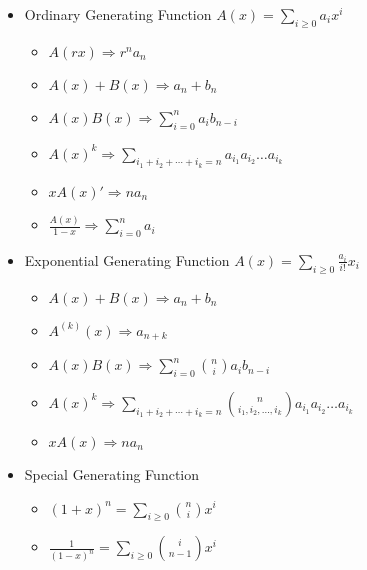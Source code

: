 \begin{itemize}
\item Ordinary Generating Function
$A(x) = \sum_{i\ge 0} a_ix^i$
\begin{itemize}
    \itemsep-0.5em
    \item $A(rx)             \Rightarrow r^na_n$
    \item $A(x) + B(x)       \Rightarrow a_n + b_n$
    \item $A(x)B(x)          \Rightarrow \sum_{i=0}^{n} a_ib_{n-i}$
    \item $A(x)^k            \Rightarrow \sum_{i_1+i_2+\cdots+i_k=n} a_{i_1}a_{i_2}\ldots a_{i_k}$
    \item $xA(x)'            \Rightarrow na_n$
    \item $\frac{A(x)}{1-x}  \Rightarrow \sum_{i=0}^{n} a_i$
\end{itemize}
\item Exponential Generating Function
$A(x) = \sum_{i\ge 0} \frac{a_i}{i!}x_i$
\begin{itemize}
    \itemsep-0.5em
    \item $A(x) + B(x)       \Rightarrow a_n + b_n$
    \item $A^{(k)}(x)        \Rightarrow a_{n+k}$
    \item $A(x)B(x)          \Rightarrow \sum_{i=0}^{n} \binom{n}{i}a_ib_{n-i}$
    \item $A(x)^k            \Rightarrow \sum_{i_1+i_2+\cdots+i_k=n} \binom{n}{i_1, i_2, \ldots, i_k}a_{i_1}a_{i_2}\ldots a_{i_k}$
    \item $xA(x)             \Rightarrow na_n$
\end{itemize}
\item Special Generating Function
\begin{itemize}
    \itemsep-0.5em
    \item $(1+x)^n           = \sum_{i\ge 0} \binom{n}{i}x^i$
    \item $\frac{1}{(1-x)^n} = \sum_{i\ge 0} \binom{i}{n-1}x^i$
\end{itemize}
\end{itemize}